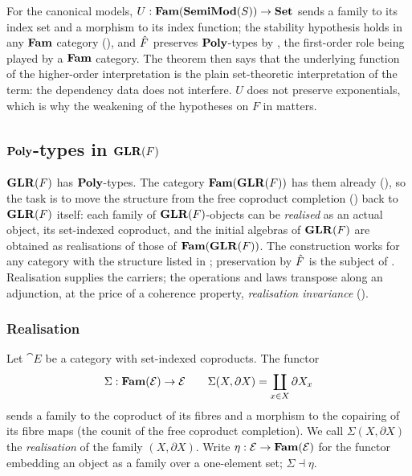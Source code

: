 For the canonical models, $U : \mathbf{Fam}(\mathbf{SemiMod}(S)) \to \mathbf{Set}$ sends a family to its index set
and a morphism to its index function; the stability hypothesis holds in any $\mathbf{Fam}$ category
(), and $\hat{F}$ preserves $\mathbf{Poly}$-types by
, the first-order role being played by a $\mathbf{Fam}$
category. The theorem then says that the underlying function of the
higher-order interpretation is the plain set-theoretic interpretation of the term: the dependency
data does not interfere. $U$ does not preserve exponentials, which is why
the weakening of the hypotheses on $F$ in  matters.

\subsection{$\mathbf{Poly}$-types in $\mathbf{GLR}(F)$}
\label{sec:conservativity:glr-poly-types}

$\mathbf{GLR}(F)$ has $\mathbf{Poly}$-types. The category $\mathbf{Fam}(\mathbf{GLR}(F))$ has them already
(), so the task is to move the structure from the free
coproduct completion () back to $\mathbf{GLR}(F)$ itself: each family of
$\mathbf{GLR}(F)$-objects can be \emph{realised} as an actual object, its set-indexed coproduct, and the
initial algebras of $\mathbf{GLR}(F)$ are obtained as realisations of those of $\mathbf{Fam}(\mathbf{GLR}(F))$. The
construction works for any category with the structure listed in
; preservation by $\hat{F}$ is the subject of
. Realisation supplies the carriers; the operations and laws transpose along an
adjunction, at the price of a coherence property, \emph{realisation invariance}
().

\subsubsection{Realisation}
Let $\cat{E}$ be a category with set-indexed coproducts. The functor
\[
  \Sigma : \mathbf{Fam}(\mathcal{E}) \to \mathcal{E} \qquad \Sigma(X, \partial X) = \coprod_{x \in X} \partial X_x
\]
sends a family to the coproduct of its fibres and a morphism to the copairing of its fibre maps (the
counit of the free coproduct completion). We call $\Sigma(X, \partial X)$ the
\emph{realisation} of the family $(X, \partial X)$. Write $\eta : \mathcal{E} \to \mathbf{Fam}(\mathcal{E})$
for the functor embedding an object as a family over a one-element set; $\Sigma \dashv \eta$.

